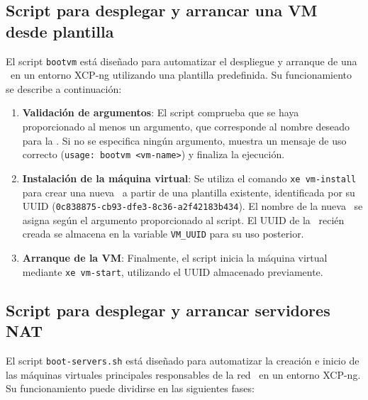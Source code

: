 

\subsection{Script para desplegar y arrancar una VM desde plantilla}
\noindent
El script \texttt{bootvm} está diseñado para automatizar el despliegue y arranque de una \VM\ en un entorno XCP-ng utilizando una plantilla predefinida. Su funcionamiento se describe a continuación:

\begin{enumerate}
    \item \textbf{Validación de argumentos}:  
    El script comprueba que se haya proporcionado al menos un argumento, que corresponde al nombre deseado para la \VM. Si no se especifica ningún argumento, muestra un mensaje de uso correcto (\texttt{usage: bootvm <vm-name>}) y finaliza la ejecución.

    \item \textbf{Instalación de la máquina virtual}:  
    Se utiliza el comando \texttt{xe vm-install} para crear una nueva \VM\ a partir de una plantilla existente, identificada por su UUID (\texttt{0c838875-cb93-dfe3-8c36-a2f42183b434}). El nombre de la nueva \VM\ se asigna según el argumento proporcionado al script. El UUID de la \VM\ recién creada se almacena en la variable \texttt{VM\_UUID} para su uso posterior.

    \item \textbf{Arranque de la VM}:  
    Finalmente, el script inicia la máquina virtual mediante \texttt{xe vm-start}, utilizando el UUID almacenado previamente.

\end{enumerate}



\subsection{Script para desplegar y arrancar servidores NAT}
\noindent
El script \texttt{boot-servers.sh} está diseñado para automatizar la creación e inicio de las máquinas virtuales principales responsables de la red \NAT\ en un entorno XCP-ng. Su funcionamiento puede dividirse en las siguientes fases:

